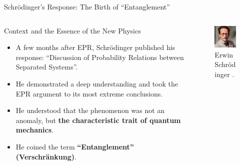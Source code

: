 \begin{frame}{Schrödinger's Response: The Birth of ``Entanglement''}

  \begin{columns}[T] %
    \begin{column}{0.6\textwidth}
      \begin{block}{Context and the Essence of the New Physics}
        \begin{itemize}[<+->]
          \item A few months after EPR, Schrödinger published his response: ``Discussion of Probability Relations between Separated Systems''.
          \item He demonstrated a deep understanding and took the EPR argument to its most extreme conclusions.
          \item He understood that the phenomenon was not an anomaly, but \textbf{the characteristic trait of quantum mechanics}.
          \item He coined the term \textbf{``Entanglement'' (Verschränkung)}.
        \end{itemize}
    \end{block}
\end{column}

    \begin{column}{0.4\textwidth}
      \begin{figure}
        \centering
        \includegraphics[width=\linewidth, height=0.7\textheight, keepaspectratio]{images/schrodinger.jpeg}
        \caption{Erwin Schrödinger \cite{Anon1933_Schrodinger}.}
      \end{figure}
    \end{column}
  \end{columns}

\end{frame}

